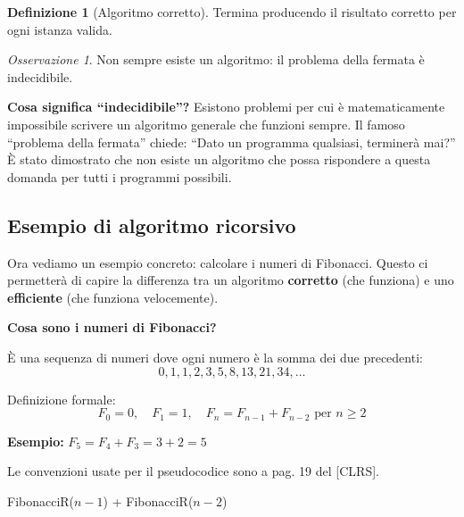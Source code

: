 \documentclass[a4paper, 11pt]{article}
\theoremstyle{definition}
\newtheorem{definizione}{Definizione}[section]
\theoremstyle{remark}
\newtheorem{osservazione}{Osservazione}
\theoremstyle{remark}
\newenvironment{nota}{%
	\begin{tcolorbox}[
		colback=codebg,
		colframe=primary,
		fonttitle=\bfseries,
		title=Nota,
		left=6pt, right=6pt, top=4pt, bottom=4pt
		]
	}{%
	\end{tcolorbox}
}
\begin{document}
	\begin{definizione}[Algoritmo corretto]
		Termina producendo il risultato corretto per ogni istanza valida.
	\end{definizione}
	
	\begin{osservazione}
		Non sempre esiste un algoritmo: il problema della fermata è indecidibile.
	\end{osservazione}
	
	\begin{nota}
		\textbf{Cosa significa ``indecidibile''?} Esistono problemi per cui è matematicamente impossibile scrivere un algoritmo generale che funzioni sempre. Il famoso ``problema della fermata'' chiede: ``Dato un programma qualsiasi, terminerà mai?'' È stato dimostrato che non esiste un algoritmo che possa rispondere a questa domanda per tutti i programmi possibili.
	\end{nota}
	
	
	\subsection{Esempio di algoritmo ricorsivo}
	
	\begin{softnote}
		Ora vediamo un esempio concreto: calcolare i numeri di Fibonacci. Questo ci permetterà di capire la differenza tra un algoritmo \textbf{corretto} (che funziona) e uno \textbf{efficiente} (che funziona velocemente).
	\end{softnote}
	
	\begin{nota}
		\textbf{Cosa sono i numeri di Fibonacci?}
		
		È una sequenza di numeri dove ogni numero è la somma dei due precedenti:
		\[
		0, 1, 1, 2, 3, 5, 8, 13, 21, 34, \ldots
		\]
		
		Definizione formale:
		\[
		F_0 = 0, \quad F_1 = 1, \quad F_n = F_{n-1} + F_{n-2} \text{ per } n \geq 2
		\]
		
		\textbf{Esempio:} $F_5 = F_4 + F_3 = 3 + 2 = 5$
	\end{nota}
	
	\begin{nota}
		Le convenzioni usate per il pseudocodice sono a pag. 19 del [CLRS].
	\end{nota}
	
	\begin{algorithm}[H]
		\caption{FibonacciR}
		\Return FibonacciR($n-1$) + FibonacciR($n-2$)\;
	\end{algorithm}
	
\end{document}
